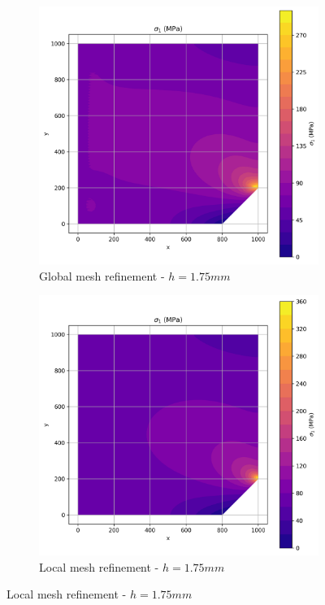 \begin{figure}[H]
  \centering
  \begin{subfigure}[b]{0.45\textwidth}
    \centering
    \includegraphics[width=\textwidth]{GRAFICOS/Quad9/1.75mm_global/resultados - sigma_1.png}
    \caption{Global mesh refinement - $h=1.75mm$}
    \label{fig:img11}
  \end{subfigure}
  \hfill
  \begin{subfigure}[b]{0.45\textwidth}
    \centering
    \includegraphics[width=\textwidth]{GRAFICOS/Quad9/1.75mm_local/resultados - sigma_1.png}
    \caption{Local mesh refinement - $h=1.75mm$}
    \label{fig:img21}
  \end{subfigure}
\end{figure}

